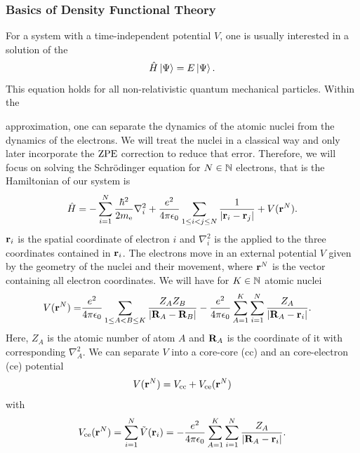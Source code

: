 \subsubsection{Basics of Density Functional Theory}
For a system with a time-independent potential $V$, one is usually interested in
a solution of the 
\begin{equation}
 \hat{H} \left|\Psi{}\right\rangle = E \left|\Psi{}\right\rangle.
 \label{Theo:Schroedinger}
\end{equation}
This equation holds for all non-relativistic quantum mechanical particles.
Within the \begin{otherlanguage}{ngerman}
\end{otherlanguage} approximation, one can separate the dynamics of the atomic
nuclei from the dynamics of the electrons. We will treat the nuclei in a classical way and only later incorporate the $\text{ZPE}$ correction to reduce
that error. Therefore, we will focus on solving the Schrödinger
equation for $N \in \mathbb{N}$ electrons, that is the Hamiltonian of our system is
\begin{equation}
 \hat{H} = -\sum_{i=1}^N \frac{\hbar^2}{2m_\text e} \nabla_i^2 + \frac {e^2} {4 \pi
 \epsilon_0} \sum_{1\le i < j \le N} \frac 1 {\left|{\mathbf{r}_i - \mathbf{r}_j}\right|} + V(\mathbf{r}^N).
 \label{Theo:Hamiltonian}
\end{equation}
$\mathbf{r}_i$ is the spatial coordinate of electron $i$ and $\nabla_i^2$ is the
 applied to the three coordinates contained in $\mathbf{r}_i$.
The electrons move in an external potential $V$ given by the geometry of the
nuclei and their movement, where $\mathbf{r}^N$ is the vector containing all electron
coordinates.
We will have for $K \in \mathbb{N}$ atomic nuclei
\begin{equation}
\begin{aligned}
V(\mathbf{r}^N)=& \frac {e^2} {4 \pi \epsilon_0} \sum_{1\le A < B \le K} \frac {Z_A Z_B}
{\left|{\mathbf{R}_A - \mathbf{R}_B}\right|} - \frac {e^2} {4 \pi \epsilon_0} \sum_{A=1}^K \sum_{i=1}^N
\frac {Z_A} {\left|{\mathbf{R}_A - \mathbf{r}_i}\right|}.
\end{aligned}
\label{Theo:CorePotential}
\end{equation}
Here, $Z_A$ is the atomic number of atom $A$ and $\mathbf{R}_A$ is the coordinate of
it with corresponding $\nabla_A^2$. We can separate $V$ into a core-core (cc)
and an core-electron (ce) potential \newcommand\vce{V_{\te{ce}}}
\newcommand\vcc{V_{\te{cc}}}
\begin{equation}
 V(\r^N)=\vcc+\vce(\r^N)
\label{Theo:SeparatePotential}
\end{equation}
with
\begin{equation}
 \vce(\r^N)=\sum_{i=1}^N \tilde V(\r_i) = - \frac {e^2} {4 \pi \e_0} \sum_{A=1}^K \sum_{i=1}^N \frac {Z_A} {\abs{\bo R_A - \r_i}}.
 \label{Theo:CoreElectronPotential}
\end{equation}



